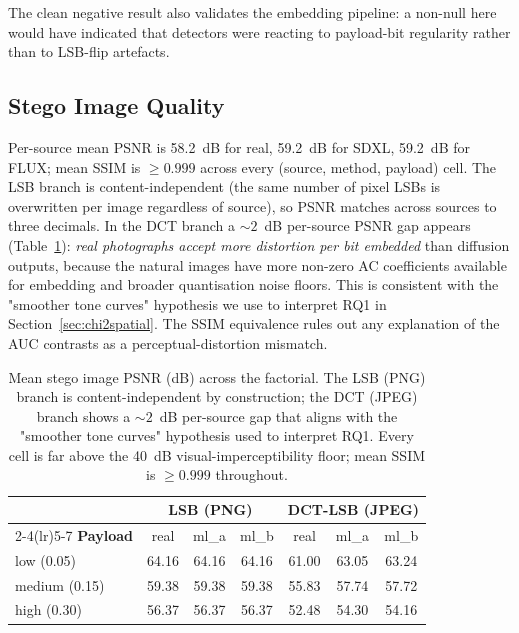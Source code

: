 \documentclass[10pt,twocolumn,a4paper]{article}
\begin{document}
The clean negative result also validates the embedding pipeline: a non-null here would have indicated that detectors were reacting to payload-bit regularity rather than to LSB-flip artefacts.

\subsection{Stego Image Quality}

Per-source mean PSNR is 58.2~dB for real, 59.2~dB for SDXL, 59.2~dB for FLUX; mean SSIM is $\geq\!0.999$ across every (source, method, payload) cell. The LSB branch is content-independent (the same number of pixel LSBs is overwritten per image regardless of source), so PSNR matches across sources to three decimals. In the DCT branch a $\sim\!2$~dB per-source PSNR gap appears (Table~\ref{tab:quality}): \emph{real photographs accept more distortion per bit embedded} than diffusion outputs, because the natural images have more non-zero AC coefficients available for embedding and broader quantisation noise floors. This is consistent with the "smoother tone curves" hypothesis we use to interpret RQ1 in Section~\ref{sec:chi2spatial}. The SSIM equivalence rules out any explanation of the AUC contrasts as a perceptual-distortion mismatch.

\begin{table}[t]
\centering\small
\caption{Mean stego image PSNR (dB) across the factorial. The LSB (PNG) branch is content-independent by construction; the DCT (JPEG) branch shows a $\sim\!2$~dB per-source gap that aligns with the "smoother tone curves" hypothesis used to interpret RQ1. Every cell is far above the 40~dB visual-imperceptibility floor; mean SSIM is $\geq\!0.999$ throughout.}
\label{tab:quality}
\setlength{\tabcolsep}{5pt}\renewcommand{\arraystretch}{1.1}
\begin{tabular}{@{}l c c c c c c@{}}
\toprule
& \multicolumn{3}{c}{\textbf{LSB (PNG)}} & \multicolumn{3}{c}{\textbf{DCT-LSB (JPEG)}} \\
\cmidrule(lr){2-4}\cmidrule(lr){5-7}
\textbf{Payload} & real & ml\_a & ml\_b & real & ml\_a & ml\_b \\
\midrule
low (0.05)    & 64.16 & 64.16 & 64.16 & 61.00 & 63.05 & 63.24 \\
medium (0.15) & 59.38 & 59.38 & 59.38 & 55.83 & 57.74 & 57.72 \\
high (0.30)   & 56.37 & 56.37 & 56.37 & 52.48 & 54.30 & 54.16 \\
\bottomrule
\end{tabular}
\end{table}
\end{document}
